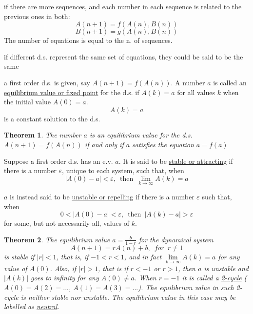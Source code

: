 \documentclass[12pt]{article}
\newtheorem{theor}{Theorem}
\begin{document}
\begin{description}
\item[D.s. of $\geq 2$ equations] if there are more sequences, and each number in each sequence is related to the previous ones in both:
\[A(n+1) = f(A(n), B(n))\]
\[B(n+1) = g(A(n), B(n))\]
The number of equations is equal to the n. of sequences.
\item[(!)] if different d.s. represent the same set of equations, they could be said to be the same
\item[Equilibrium value] a first order d.s. is given, say $A(n+1) = f(A(n))$. A number $a$ is called an \underline{equilibrium value or fixed point} for the d.s. if $A(k) = a$ for all values $k$ when the initial value $A(0) = a$. 
\[A(k) = a\] is a constant solution to the d.s.
\item\begin{theor}
The number $a$ is an equilibrium value for the d.s. $A(n+1) = f(A(n))$ if and only if $a$ satisfies the equation $a = f(a)$
\end{theor}
\item[Stable e.v. - Attracting f.p.] Suppose a first order d.s. has an e.v. $a$. It is said to be \underline{stable or attracting} if there is a number $\varepsilon$, unique to each system, such that, when \[|A(0) - a| < \varepsilon ,\enspace \textrm{then} \enspace \lim \limits_{k \rightarrow \infty} A(k) = a\]
\item[Unstable e.v. - Repelling f.p.] $a$ is instead said to be \underline{unstable or repelling} if there is a number $\varepsilon$ such that, when \[0 < |A(0) - a| < \varepsilon ,\enspace \textrm{then} \enspace |A(k) - a| > \varepsilon\]
for some, but not necessarily all, values of $k$.
\item\begin{theor}
    The equilibrium value $a = \frac{b}{1-r}$ for the dynamical system
    \[A(n+1) = rA(n) + b , \enspace for \enspace r \neq 1\]
    is stable if $|r| < 1$, that is, if $-1 < r < 1$, and in fact $\lim \limits_{k \rightarrow \infty} A(k) = a$ for any value of $A(0)$. Also, if $|r| > 1$, that is if $r < -1$ or $r > 1$, then $a$ is unstable and $|A(k)|$ goes to infinity for any $A(0) \neq a$. When $r = -1$ it is called a \underline{2-cycle} ($A(0) = A(2) = ...$, $A(1) = A(3) = ...$). The equilibrium value in such 2-cycle is neither stable nor unstable. The equilibrium value in this case may be labelled as \underline{neutral}.
\end{theor}
\end{description}
\end{document}
